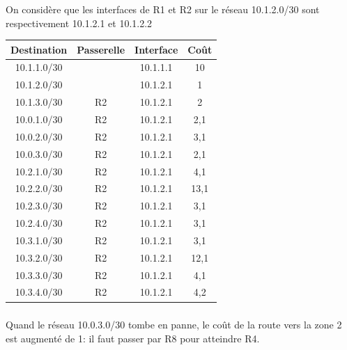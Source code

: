 \documentclass[svgnames,11pt]{beamer}
\begin{document}
\begin{frame}
    \frametitle{}

    On considère que les interfaces de R1 et R2 sur le réseau 10.1.2.0/30 sont respectivement 10.1.2.1 et 10.1.2.2 
    \begin{center}
        \begin{tabular}{|*{4}{c|}}
            \hline
            Destination & Passerelle & Interface & Coût \\
            \hline
            10.1.1.0/30 &  & 10.1.1.1 & 10 \\
            \hline
            10.1.2.0/30 &  & 10.1.2.1 & 1 \\
            \hline
            10.1.3.0/30 & R2 & 10.1.2.1 & 2 \\
            \hline
            10.0.1.0/30 & R2 & 10.1.2.1 & 2,1 \\
            \hline
            10.0.2.0/30 & R2 & 10.1.2.1 & 3,1 \\
            \hline
            10.0.3.0/30 & R2 & 10.1.2.1 & 2,1 \\
            \hline
            10.2.1.0/30 & R2 & 10.1.2.1 & 4,1 \\
            \hline
            10.2.2.0/30 & R2 & 10.1.2.1 & 13,1 \\
            \hline
            10.2.3.0/30 & R2 & 10.1.2.1 & 3,1 \\
            \hline
            10.2.4.0/30 & R2 & 10.1.2.1 & 3,1 \\
            \hline
            10.3.1.0/30 & R2 & 10.1.2.1 & 3,1 \\
            \hline
            10.3.2.0/30 & R2 & 10.1.2.1 & 12,1 \\
            \hline
            10.3.3.0/30 & R2 & 10.1.2.1 & 4,1 \\
            \hline
            10.3.4.0/30 & R2 & 10.1.2.1 & 4,2 \\
            \hline
        \end{tabular}
    \end{center}

\end{frame}
\begin{frame}
    \frametitle{}

    Quand le réseau 10.0.3.0/30 tombe en panne, le coût de la route vers la zone 2 est augmenté de 1: il faut passer par R8 pour atteindre R4.

\end{frame}
\end{document}
